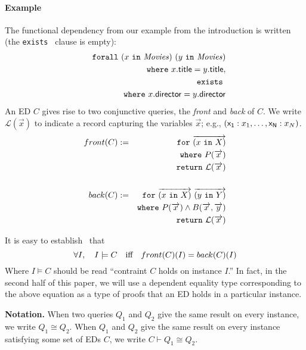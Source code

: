 \documentclass[preprint]{sigplanconf}
\newcommand{\FOR}{{\tt for} \ }
\newcommand{\FORALL}{{\tt forall} \ }
\newcommand{\EXISTS}{{\tt exists} \ }
\newcommand{\WHERE}{{\tt where} \ }
\newcommand{\IN}{ \ {\tt in} \ }
\newcommand{\RETURN}{{\tt return} \ }
\newcommand{\relation}[1]{\ensuremath{\mathit{#1}}\xspace}
\begin{document}
\paragraph{Example}
The functional dependency from our example from the introduction is written (the \EXISTS clause is empty):
\begin{eqnarray*}
& & \FORALL (x \IN \relation{Movies}) \ (y \IN \relation{Movies}) \\
& & \WHERE x.{\sf title} = y.{\sf title}, \\ 
& & \EXISTS \\
& & \WHERE x.{\sf director} = y.{\sf director}
\end{eqnarray*}
An ED $C$ gives rise to two conjunctive queries, the {\it front} and {\it back} of $C$.  We write $\mathcal{L}
(\overrightarrow{x})$ to indicate a record capturing the variables $\overrightarrow{x}
$; e.g., $({\sf x_1}: x_1, \ldots ,{\sf x_N}: x_N)$.  %
\begin{eqnarray*}
front(C)& := & \FOR \overrightarrow{(x \IN X)} \\ 
& & \WHERE P(\overrightarrow{x}) \\
& & \RETURN \mathcal{L}(\overrightarrow{x})  \\
& & \\
back(C) & := & \FOR \overrightarrow{(x \IN X)} \ \overrightarrow{(y \IN Y)} \\ 
& & \WHERE P(\overrightarrow{x}) \wedge B(\overrightarrow{x}, \overrightarrow{y}) \\
& & \RETURN \mathcal{L}(\overrightarrow{x})
\end{eqnarray*}

It is easy to establish~\cite{Popa99anequational} that 
\[
\forall I, \quad I \models C \quad \textnormal{iff} \quad front(C)(I) = back(C)(I)
\]
Where $I \models C$ should be read ``contraint $C$ holds on instance $I$.''
In fact, in the second half of this paper, we will use a dependent equality type corresponding to the above equation as a type of proofs that an ED holds in a particular instance.

\textbf{Notation.}  When two queries $Q_1$ and $Q_2$ give the same result on every instance, we write $Q_1 \cong Q_2$.  When $Q_1$ and $Q_2$ give the same result on every instance satisfying some set of EDs $C$, we write $C \vdash Q_1 \cong Q_2$.
\end{document}
